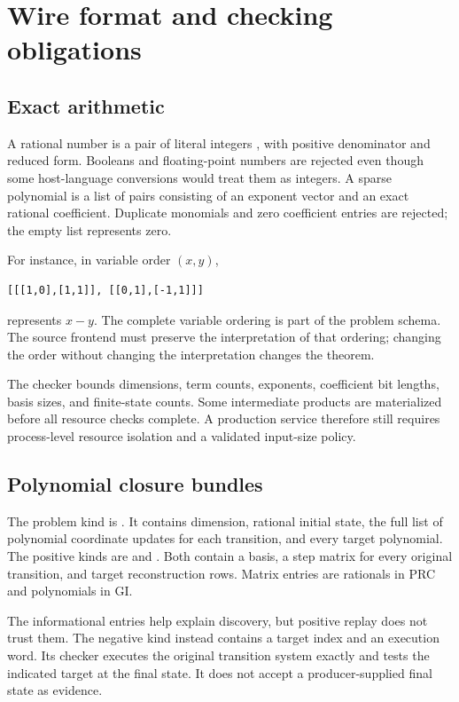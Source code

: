 \section{Wire format and checking obligations}
\label{sec:wire}

\subsection{Exact arithmetic}

A rational number is a pair of literal integers , with positive denominator and reduced form. Booleans and floating-point numbers are rejected even though some host-language conversions would treat them as integers. A sparse polynomial is a list of pairs consisting of an exponent vector and an exact rational coefficient. Duplicate monomials and zero coefficient entries are rejected; the empty list represents zero.

For instance, in variable order $(x,y)$,
\begin{lstlisting}
[[[1,0],[1,1]], [[0,1],[-1,1]]]
\end{lstlisting}
represents $x-y$. The complete variable ordering is part of the problem schema. The source frontend must preserve the interpretation of that ordering; changing the order without changing the interpretation changes the theorem.

The checker bounds dimensions, term counts, exponents, coefficient bit lengths, basis sizes, and finite-state counts. Some intermediate products are materialized before all resource checks complete. A production service therefore still requires process-level resource isolation and a validated input-size policy.

\subsection{Polynomial closure bundles}

The problem kind is . It contains dimension, rational initial state, the full list of polynomial coordinate updates for each transition, and every target polynomial. The positive kinds are  and . Both contain a basis, a step matrix for every original transition, and target reconstruction rows. Matrix entries are rationals in PRC and polynomials in GI.

The informational  entries help explain discovery, but positive replay does not trust them. The negative kind  instead contains a target index and an execution word. Its checker executes the original transition system exactly and tests the indicated target at the final state. It does not accept a producer-supplied final state as evidence.

